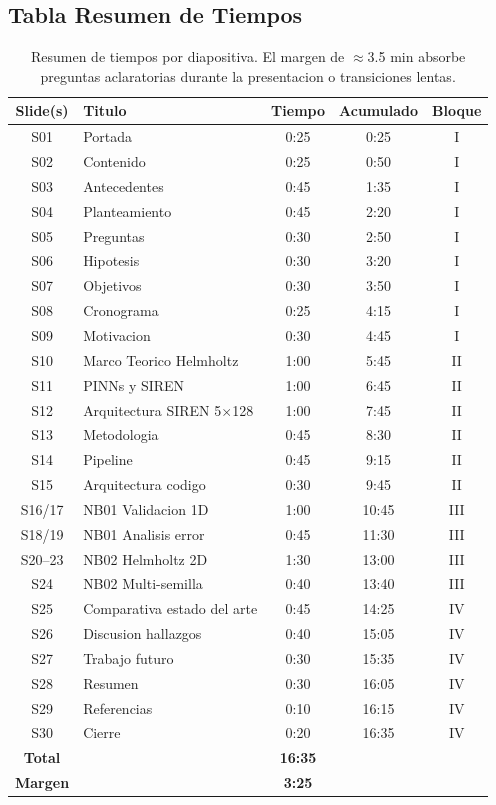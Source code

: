 \vspace{16pt}

\subsection{Tabla Resumen de Tiempos}

\begin{table}[h!]
\centering
\small
\begin{tabular}{@{}clccc@{}}
\toprule
\textbf{Slide(s)} & \textbf{Titulo} & \textbf{Tiempo} & \textbf{Acumulado} & \textbf{Bloque} \\
\midrule
S01 & Portada & 0:25 & 0:25 & I \\
S02 & Contenido & 0:25 & 0:50 & I \\
S03 & Antecedentes & 0:45 & 1:35 & I \\
S04 & Planteamiento & 0:45 & 2:20 & I \\
S05 & Preguntas & 0:30 & 2:50 & I \\
S06 & Hipotesis & 0:30 & 3:20 & I \\
S07 & Objetivos & 0:30 & 3:50 & I \\
S08 & Cronograma & 0:25 & 4:15 & I \\
S09 & Motivacion & 0:30 & 4:45 & I \\
\midrule
S10 & Marco Teorico Helmholtz & 1:00 & 5:45 & II \\
S11 & PINNs y SIREN & 1:00 & 6:45 & II \\
S12 & Arquitectura SIREN 5$\times$128 & 1:00 & 7:45 & II \\
S13 & Metodologia & 0:45 & 8:30 & II \\
S14 & Pipeline & 0:45 & 9:15 & II \\
S15 & Arquitectura codigo & 0:30 & 9:45 & II \\
\midrule
S16/17 & NB01 Validacion 1D & 1:00 & 10:45 & III \\
S18/19 & NB01 Analisis error & 0:45 & 11:30 & III \\
S20--23 & NB02 Helmholtz 2D & 1:30 & 13:00 & III \\
S24 & NB02 Multi-semilla & 0:40 & 13:40 & III \\
\midrule
S25 & Comparativa estado del arte & 0:45 & 14:25 & IV \\
S26 & Discusion hallazgos & 0:40 & 15:05 & IV \\
S27 & Trabajo futuro & 0:30 & 15:35 & IV \\
S28 & Resumen & 0:30 & 16:05 & IV \\
S29 & Referencias & 0:10 & 16:15 & IV \\
S30 & Cierre & 0:20 & 16:35 & IV \\
\midrule
\textbf{Total} & & \textbf{16:35} & & \\
\textbf{Margen} & & \textbf{3:25} & & \\
\bottomrule
\end{tabular}
\caption{Resumen de tiempos por diapositiva. El margen de $\approx$3.5 min absorbe
preguntas aclaratorias durante la presentacion o transiciones lentas.}
\end{table}
